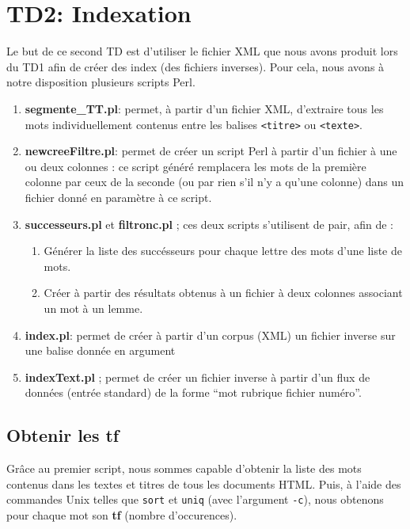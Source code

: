 \chapter{TD2: Indexation}

Le but de ce second TD est d'utiliser le fichier XML que nous avons produit lors du TD1 afin de créer des index (des fichiers inverses). Pour cela, nous avons à notre disposition plusieurs scripts Perl.

\begin{enumerate}
  \item \textbf{segmente\_TT.pl}: permet, à partir d'un fichier XML, d'extraire tous les mots individuellement contenus entre les balises \lstinline{<titre>} ou \lstinline{<texte>}.
  \item \textbf{newcreeFiltre.pl}: permet de créer un script Perl à partir d'un fichier à une ou deux colonnes : ce script généré remplacera les mots de la première colonne par ceux de la seconde (ou par rien s'il n'y a qu'une colonne) dans un fichier donné en paramètre à ce script.
  \item \textbf{successeurs.pl} et \textbf{filtronc.pl} ; ces deux scripts s'utilisent de pair, afin de :
  \begin{enumerate}
    \item Générer la liste des succésseurs pour chaque lettre des mots d'une liste de mots.
    \item Créer à partir des résultats obtenus à un fichier à deux colonnes associant un mot à un lemme.
  \end{enumerate}
  \item \textbf{index.pl}: permet de créer à partir d'un corpus (XML) un fichier inverse sur une balise donnée en argument
  \item \textbf{indexText.pl} ; permet de créer un fichier inverse à partir d'un flux de données (entrée standard) de la forme ``mot rubrique fichier numéro''.
\end{enumerate}

\section{Obtenir les tf}
\fakeshell

Grâce au premier script, nous sommes capable d'obtenir la liste des mots contenus dans les textes et titres de tous les documents HTML. Puis, à l'aide des commandes Unix telles que \lstinline{sort} et \lstinline{uniq} (avec l'argument \lstinline{-c}), nous obtenons pour chaque mot son \textbf{tf} (nombre d'occurences).

